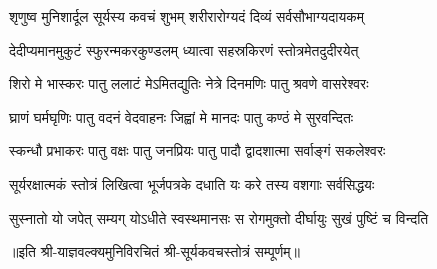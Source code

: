 


\twolineshloka
{शृणुष्व मुनिशार्दूल सूर्यस्य कवचं शुभम्}
{शरीरारोग्यदं दिव्यं सर्वसौभाग्यदायकम्}

\twolineshloka
{देदीप्यमानमुकुटं स्फुरन्मकरकुण्डलम्}
{ध्यात्वा सहस्रकिरणं स्तोत्रमेतदुदीरयेत्}

\twolineshloka
{शिरो मे भास्करः पातु ललाटं मेऽमितद्युतिः}
{नेत्रे दिनमणिः पातु श्रवणे वासरेश्वरः}

\twolineshloka
{घ्राणं घर्मघृणिः पातु वदनं वेदवाहनः}
{जिह्वां मे मानदः पातु कण्ठं मे सुरवन्दितः}

\twolineshloka
{स्कन्धौ प्रभाकरः पातु वक्षः पातु जनप्रियः}
{पातु पादौ द्वादशात्मा सर्वाङ्गं सकलेश्वरः}

\twolineshloka
{सूर्यरक्षात्मकं स्तोत्रं लिखित्वा भूर्जपत्रके}
{दधाति यः करे तस्य वशगाः सर्वसिद्धयः}

\twolineshloka
{सुस्नातो यो जपेत् सम्यग् योऽधीते स्वस्थमानसः}
{स रोगमुक्तो दीर्घायुः सुखं पुष्टिं च विन्दति}

॥इति श्री-याज्ञवल्क्यमुनिविरचितं श्री-सूर्यकवचस्तोत्रं सम्पूर्णम्॥